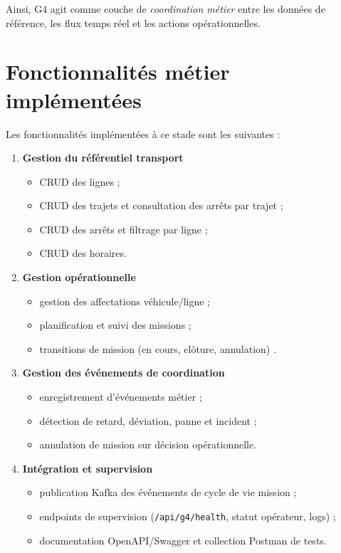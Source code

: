 \documentclass[12pt,a4paper]{report}
\begin{document}
Ainsi, G4 agit comme couche de \textit{coordination métier} entre les données de
référence, les flux temps réel et les actions opérationnelles.

\section{Fonctionnalités métier implémentées}
Les fonctionnalités implémentées à ce stade sont les suivantes :

\begin{enumerate}
  \item \textbf{Gestion du référentiel transport}
  \begin{itemize}
    \item CRUD des lignes ;
    \item CRUD des trajets et consultation des arrêts par trajet ;
    \item CRUD des arrêts et filtrage par ligne ;
    \item CRUD des horaires.
  \end{itemize}

  \item \textbf{Gestion opérationnelle}
  \begin{itemize}
    \item gestion des affectations véhicule/ligne ;
    \item planification et suivi des missions ;
    \item transitions de mission (en cours, clôture, annulation) .
  \end{itemize}

  \item \textbf{Gestion des événements de coordination}
  \begin{itemize}
    \item enregistrement d'événements métier ;
    \item détection de retard, déviation, panne et incident ;
    \item annulation de mission sur décision opérationnelle.
  \end{itemize}

  \item \textbf{Intégration et supervision}
  \begin{itemize}
    \item publication Kafka des événements de cycle de vie mission ;
    \item endpoints de supervision (\texttt{/api/g4/health}, statut opérateur, logs) ;
    \item documentation OpenAPI/Swagger et collection Postman de tests.
  \end{itemize}
\end{enumerate}
\end{document}
